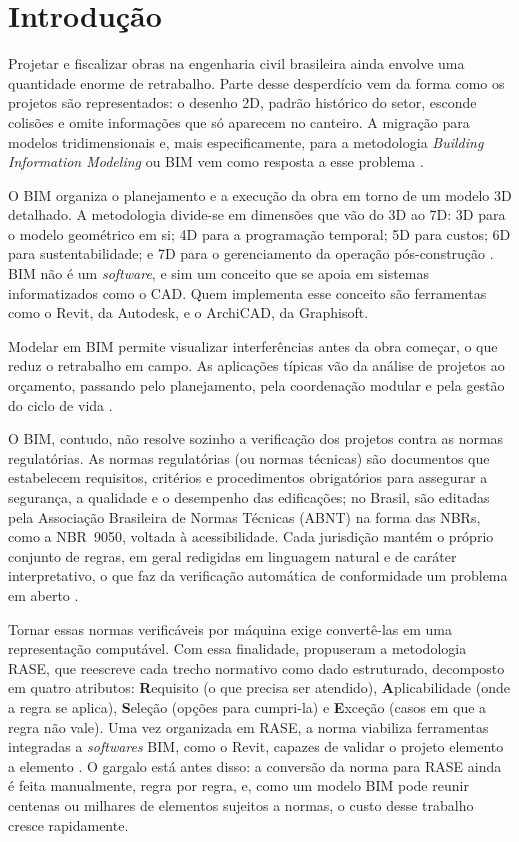 \chapter{Introdução}

Projetar e fiscalizar obras na engenharia civil brasileira ainda envolve uma quantidade enorme de retrabalho. Parte desse desperdício vem da forma como os projetos são representados: o desenho 2D, padrão histórico do setor, esconde colisões e omite informações que só aparecem no canteiro. A migração para modelos tridimensionais e, mais especificamente, para a metodologia \textit{Building Information Modeling} ou BIM vem como resposta a esse problema \cite{eastman2011}.

O BIM organiza o planejamento e a execução da obra em torno de um modelo 3D detalhado. A metodologia divide-se em dimensões que vão do 3D ao 7D: 3D para o modelo geométrico em si; 4D para a programação temporal; 5D para custos; 6D para sustentabilidade; e 7D para o gerenciamento da operação pós-construção \cite{eastman2011}. BIM não é um \textit{software}, e sim um conceito que se apoia em sistemas informatizados como o CAD. Quem implementa esse conceito são ferramentas como o Revit, da Autodesk, e o ArchiCAD, da Graphisoft.

Modelar em BIM permite visualizar interferências antes da obra começar, o que reduz o retrabalho em campo. As aplicações típicas vão da análise de projetos ao orçamento, passando pelo planejamento, pela coordenação modular e pela gestão do ciclo de vida \cite{eastman2011}.

O BIM, contudo, não resolve sozinho a verificação dos projetos contra as normas regulatórias. As normas regulatórias (ou normas técnicas) são documentos que estabelecem requisitos, critérios e procedimentos obrigatórios para assegurar a segurança, a qualidade e o desempenho das edificações; no Brasil, são editadas pela Associação Brasileira de Normas Técnicas (ABNT) na forma das NBRs, como a NBR~9050, voltada à acessibilidade. Cada jurisdição mantém o próprio conjunto de regras, em geral redigidas em linguagem natural e de caráter interpretativo, o que faz da verificação automática de conformidade um problema em aberto \cite{dimyadi2013,solihin2015}.

Tornar essas normas verificáveis por máquina exige convertê-las em uma representação computável. Com essa finalidade,  propuseram a metodologia RASE, que reescreve cada trecho normativo como dado estruturado, decomposto em quatro atributos: \textbf{R}equisito (o que precisa ser atendido), \textbf{A}plicabilidade (onde a regra se aplica), \textbf{S}eleção (opções para cumpri-la) e \textbf{E}xceção (casos em que a regra não vale). Uma vez organizada em RASE, a norma viabiliza ferramentas integradas a \textit{softwares} BIM, como o Revit, capazes de validar o projeto elemento a elemento \cite{santos2021}. O gargalo está antes disso: a conversão da norma para RASE ainda é feita manualmente, regra por regra, e, como um modelo BIM pode reunir centenas ou milhares de elementos sujeitos a normas, o custo desse trabalho cresce rapidamente.

